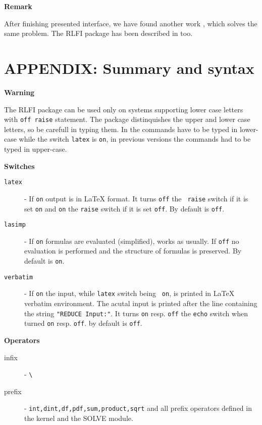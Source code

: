 \centerline{\bf Remark}

After finishing presented interface, we have found another work
\cite{Antweiler:89}, which solves the same problem. The RLFI package has
been described in \cite{Drska:90} too.






\vskip0.5cm

\section{APPENDIX: Summary and syntax}

{\bf Warning}

The RLFI package can be used only on systems supporting lower case
letters with {\tt off raise} statement. The package distinquishes the
upper and lower case letters, so be carefull in typing them.
In  the \REDUCE commands have to be typed in lower-case
while the switch {\tt latex} is {\tt on}, in previous versions
the commands had to be typed in upper-case.

{\bf Switches}

\begin{description}
\item[{\tt latex}]
- If {\tt on} output is in \LaTeX{} format. It turns {\tt off} the {\tt
raise} switch if it is set {\tt on} and {\tt on} the {\tt raise} switch
if it is set {\tt off}. By default is {\tt off}.
\item[{\tt lasimp}]
- If {\tt on} formulas are evaluated (simplified), \REDUCE{} works
as usually. If {\tt off} no evaluation is performed and the structure
of formulas is preserved. By default is {\tt on}.
\item[{\tt verbatim}]
- If {\tt on} the \REDUCE{} input, while {\tt latex} switch being {\tt
on}, is printed in \LaTeX{} verbatim environment. The acutal \REDUCE{}
input is printed after the line containing the string {\tt "REDUCE
Input:"}.  It turns {\tt on} resp. {\tt off} the {\tt echo} switch when
turned {\tt on} resp. {\tt off}. by default is {\tt off}.
\end{description}

{\bf Operators}

\begin{description}
\item[infix] - \verb+\+
\item[prefix] - {\tt int,dint,df,pdf,sum,product,sqrt} and all \REDUCE{}
prefix operators defined in the \REDUCE{} kernel and the SOLVE module.
\end{description}


